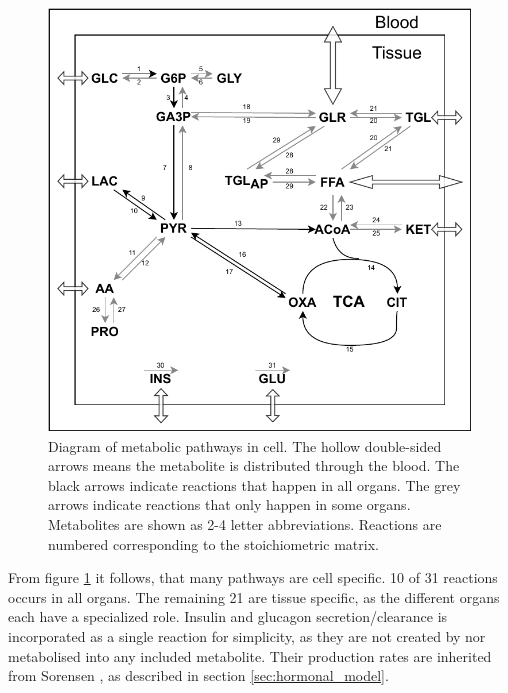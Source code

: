 \documentclass{IEEEtran}
\begin{document}
\begin{figure}[H]
    \centering
    \includegraphics[width=\columnwidth]{Diagrams/Metabolic_map_artikel_v3_numeric.pdf}
    \caption{Diagram of metabolic pathways in cell. The hollow double-sided arrows means the metabolite is distributed through the blood. The black arrows indicate reactions that happen in all organs. The grey arrows indicate reactions that only happen in some organs. Metabolites are shown as 2-4 letter abbreviations. Reactions are numbered corresponding to the stoichiometric matrix.}
    \label{fig:metabolic_map}
\end{figure}

From figure \ref{fig:metabolic_map} it follows, that many pathways are cell specific. 10 of 31 reactions occurs in all organs. The remaining 21 are tissue specific, as the different organs each have a specialized role. Insulin and glucagon secretion/clearance is incorporated as a single reaction for simplicity, as they are not created by nor metabolised into any included metabolite. Their production rates are inherited from Sorensen \cite{sorensen_1978}, as described in section \ref{sec:hormonal_model}.\\
\end{document}
